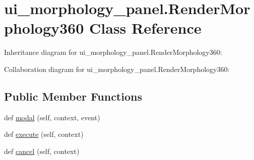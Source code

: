 \hypertarget{classui__morphology__panel_1_1RenderMorphology360}{}\section{ui\+\_\+morphology\+\_\+panel.\+Render\+Morphology360 Class Reference}
\label{classui__morphology__panel_1_1RenderMorphology360}


Inheritance diagram for ui\+\_\+morphology\+\_\+panel.\+Render\+Morphology360\+:


Collaboration diagram for ui\+\_\+morphology\+\_\+panel.\+Render\+Morphology360\+:
\subsection*{Public Member Functions}
\begin{DoxyCompactItemize}
\item 
def \hyperlink{classui__morphology__panel_1_1RenderMorphology360_ae2110c3b425f0327152cfa4e6b4137c6}{modal} (self, context, event)
\item 
def \hyperlink{classui__morphology__panel_1_1RenderMorphology360_a1329730f1503ed5ea0d1e50ca677e817}{execute} (self, context)
\item 
def \hyperlink{classui__morphology__panel_1_1RenderMorphology360_a96ac23f82b12487c01c4c83eb66e415b}{cancel} (self, context)
\end{DoxyCompactItemize}
